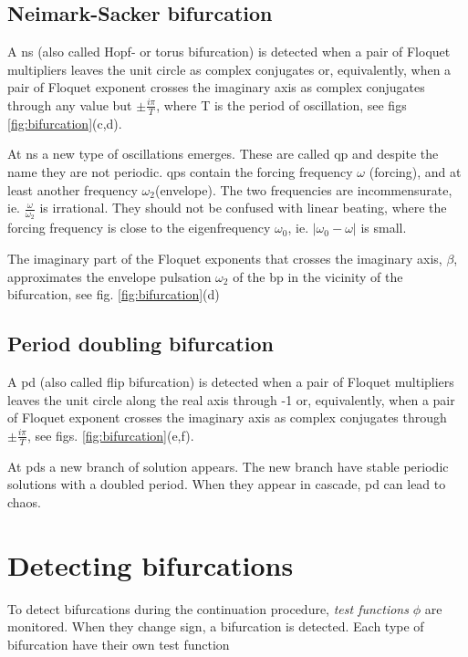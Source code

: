 \subsection{Neimark-Sacker bifurcation}
\label{sec:ns_bif}

A \gls{ns} (also called Hopf- or torus bifurcation) is detected when a pair of
Floquet multipliers leaves the unit circle as complex conjugates or,
equivalently, when a pair of Floquet exponent crosses the imaginary axis as
complex conjugates through any value but $\pm \frac{i\pi}{T}$, where T is the
period of oscillation, see figs \ref{fig:bifurcation}(c,d).

At \gls{ns} a new type of oscillations emerges. These are called \gls{qp} and
despite the name they are not periodic. \glspl{qp} contain the forcing frequency
$\omega$ (forcing), and at least another frequency $\omega_2$(envelope). The two
frequencies are incommensurate, ie. $\frac{\omega}{\omega_2}$ is irrational. They
should not be confused with linear beating, where the forcing frequency is close to
the eigenfrequency $\omega_0$, ie. $|\omega_0 - \omega|$ is small.

The imaginary part of the Floquet exponents that crosses the imaginary axis,
$\beta$, approximates the envelope pulsation $\omega_2$ of the \gls{bp} in the
vicinity of the bifurcation, see fig. \ref{fig:bifurcation}(d)


\subsection{Period doubling bifurcation}
\label{sec:pd_bif}

A \gls{pd} (also called flip bifurcation) is detected when a pair of Floquet
multipliers leaves the unit circle along the real axis through -1 or,
equivalently, when a pair of Floquet exponent crosses the imaginary axis as
complex conjugates through $\pm\frac{i\pi}{T}$, see figs.
\ref{fig:bifurcation}(e,f).

At \glspl{pd} a new branch of solution appears. The new branch have stable
periodic solutions with a doubled period. When they appear in cascade, \gls{pd}
can lead to chaos.


\section{Detecting bifurcations}
\label{sec:detecting_bifs}

To detect bifurcations during the continuation procedure, \textit{test
  functions} $\phi$ are monitored. When they change sign, a bifurcation is
detected. Each type of bifurcation have their own test function


